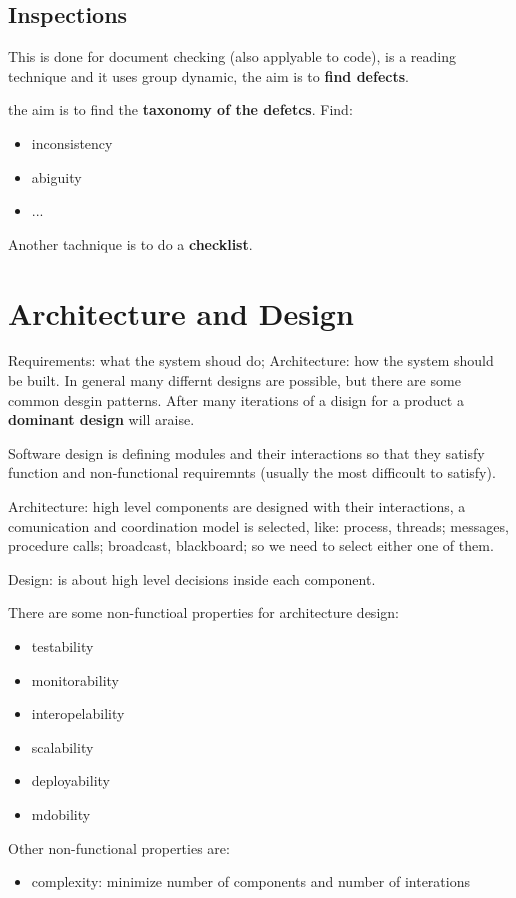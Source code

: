 \documentclass[12pt]{article}
\begin{document}
\subsection{Inspections}
This is done for document checking (also applyable to code), is a reading technique and it uses group dynamic, the aim is to \textbf{find defects}.

the aim is to find the \textbf{taxonomy of the defetcs}. Find:
\begin{itemize}
  \item inconsistency
  \item abiguity
  \item ...
\end{itemize}
Another tachnique is to do a \textbf{checklist}.


\section{Architecture and Design}
Requirements: what the system shoud do; Architecture: how the system should be built. In general many differnt designs are possible, but there are some common desgin patterns. After many iterations of a disign for a product a \textbf{dominant design} will araise.

Software design is defining modules and their interactions so that they satisfy function and non-functional requiremnts (usually the most difficoult to satisfy).

Architecture: high level components are designed with their interactions, a comunication and coordination model is selected, like: process, threads; messages, procedure calls; broadcast, blackboard; so we need to select either one of them.

Design: is about high level decisions inside each component.

There are some non-functioal properties for architecture design:
\begin{itemize}
  \item testability
  \item monitorability
  \item interopelability
  \item scalability
  \item deployability
  \item mdobility
\end{itemize}
Other non-functional properties are:
\begin{itemize}
  \item complexity: minimize number of components and number of interations
\end{itemize}
\end{document}
